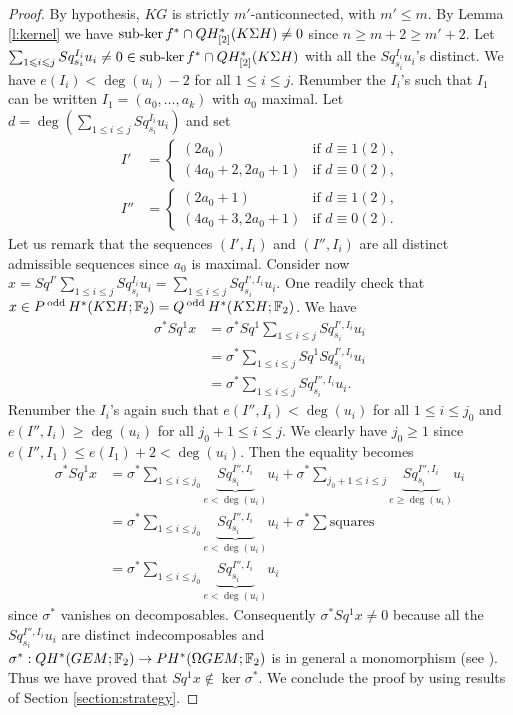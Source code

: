 \begin{proof} %
By hypothesis, $KG$ is strictly $m'$-anticonnected, with $m'\leq m$. By Lemma \ref{l:kernel} we have $\operatorname{sub-ker} f^*\cap QH^*_{[2]}(K\Sigma H)\not=0$ since $n\geq m+2\geq m'+2$. Let $\sum_{1\leqslant i\leqslant j}Sq^{I_i}_{s_i}u_i\not=0\in\operatorname{sub-ker} f^*\cap QH^*_{[2]}(K\Sigma H)$ with all the $Sq^{I_i}_{s_i}u_i$'s distinct. We have $e(I_i)<\deg(u_i)-2$ for all $1\leq i\leq j$. Renumber the $I_i$'s such that $I_1$ can be written $I_1=(a_0,\dots,a_k)$ with $a_0$ maximal. Let $d=\deg(\sum_{1\leq i\leq j}Sq^{I_i}_{s_i}u_i)$ and set
\begin{align*}
I'&=\begin{cases}
(2a_0) &\text{if $d\equiv1(2)$,}\\
(4a_0+2,2a_0+1) &\text{if $d\equiv0(2)$,}
\end{cases}\\
I''&=\begin{cases}
(2a_0+1) &\text{if $d\equiv1(2)$,}\\
(4a_0+3,2a_0+1) &\text{if $d\equiv0(2)$.}
\end{cases}
\end{align*} 
Let us remark that the sequences $(I',I_i)$ and $(I'',I_i)$ are all distinct admissible sequences since $a_0$ is maximal. Consider now $x=Sq^{I'}\sum_{1\leq i\leq j}Sq^{I_i}_{s_i}u_i=\sum_{1\leq i\leq j}Sq^{I',I_i}_{s_i}u_i$. One readily check that $x\in P\operatorname{^{odd}} H^*(K\Sigma H;\mathbb{F}_2)=Q\operatorname{^{odd}} H^*(K\Sigma H;\mathbb{F}_2)$. We have
\begin{align*}
\sigma^*Sq^1x &=\sigma^*Sq^1\sum_{1\leq i\leq j}Sq^{I',I_i}_{s_i}u_i\\
&=\sigma^*\sum_{1\leq i\leq j}Sq^1Sq^{I',I_i}_{s_i}u_i\\
&=\sigma^*\sum_{1\leq i\leq j}Sq^{I'',I_i}_{s_i}u_i.
\end{align*}
Renumber the $I_i$'s again such that $e(I'',I_i)<\deg(u_i)$ for all $1\leq i\leq j_0$ and $e(I'',I_i)\geq\deg(u_i)$ for all $j_0+1\leq i\leq j$. We clearly have $j_0\geq1$ since $e(I'',I_1)\leq e(I_1)+2<\deg(u_i)$. Then the equality becomes
\begin{align*}
\sigma^*Sq^1x&=\sigma^*\sum_{1\leq i\leq j_0}\underbrace{Sq^{I'',I_i}_{s_i}}_{e<\deg(u_i)}u_i+\sigma^*\sum_{j_0+1\leq i\leq j}\underbrace{Sq^{I'',I_i}_{s_i}}_{e\geq\deg(u_i)}u_i\\
&=\sigma^*\sum_{1\leq i\leq j_0}\underbrace{Sq^{I'',I_i}_{s_i}}_{e<\deg(u_i)}u_i+\sigma^*\sum\text{squares}\\
&=\sigma^*\sum_{1\leq i\leq j_0}\underbrace{Sq^{I'',I_i}_{s_i}}_{e<\deg(u_i)}u_i
\end{align*}
since $\sigma^*$ vanishes on decomposables. Consequently $\sigma^*Sq^1x\not=0$ because all the $Sq^{I'',I_i}_{s_i}u_i$ are distinct indecomposables and $\sigma^*:QH^*(GEM;\mathbb{F}_2)\to PH^*(\Omega GEM;\mathbb{F}_2)$ is in general a monomorphism (see \cite[Expos\'e 15, Proposition 3, p. 8]{Ca55}). Thus we have proved that $Sq^1x\not\in\ker\sigma^*$. We conclude the proof by using results of Section \ref{section:strategy}.
\end{proof}

